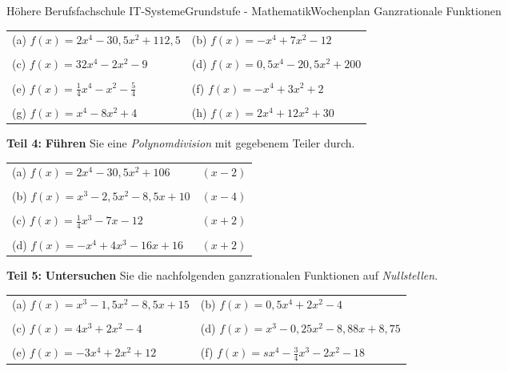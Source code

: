 \documentclass[oneside,openany,headings=optiontotoc,11pt,numbers=noenddot]{scrreprt}
\begin{document}
\begin{worksheet}{Höhere Berufsfachschule IT-Systeme}{Grundstufe - Mathematik}{Wochenplan Ganzrationale Funktionen}
\begin{framed}
			\par\noindent
			\begin{tabularx}{\textwidth}{XX}
				(a) \(f(x) = 2x^4 -30,5x^2 + 112,5\) & (b) \(f(x) = -x^4 + 7x^2 -12\)\\
				\\
				(c) \(f(x) = 32x^4-2x^2-9\) & (d) \(f(x) = 0,5x^4 -20,5x^2 +200\)\\
				\\
				(e) \(f(x) = \frac{1}{4}x^4 - x^2 - \frac{5}{4}\) & (f) \(f(x) = -x^4+3x^2+2\)\\
				\\
				(g) \(f(x) = x^4 -8x^2 +4\) & (h) \(f(x) = 2x^4+12x^2 +30\)
			\end{tabularx}
		\end{framed}
		\newpage
		\begin{framed}
			\noindent
			\textbf{Teil 4:} \textbf{Führen} Sie eine \textit{Polynomdivision} mit gegebenem Teiler durch.\\
			\par\noindent
			\begin{tabularx}{\textwidth}{XX}
				(a) \(f(x) = 2x^4 - 30,5x^2 + 106\) & \((x-2)\)\\
				\\
				(b) \(f(x) = x^3 -2,5x^2 -8,5x +10\) & \((x-4)\)\\
				\\
				(c) \(f(x) = \frac{1}{4}x^3 -7x -12\) & \((x+2)\)\\
				\\
				(d) \(f(x) = -x^4 + 4x^3 -16x+16\) & \((x+2)\)
			\end{tabularx}
		\end{framed}
		\begin{framed}
			\noindent
			\textbf{Teil 5:} \textbf{Untersuchen} Sie die nachfolgenden ganzrationalen Funktionen auf \textit{Nullstellen}.\\
			\par\noindent
			\begin{tabularx}{\textwidth}{XX}
				(a) \(f(x) = x^3- 1,5x^2 - 8,5x + 15\) & (b) \(f(x) = 0,5x^4 + 2x^2-4\)\\
				\\
				(c) \(f(x) = 4x^3 +2x^2 - 4\) & (d) \(f(x) = x^3 -0,25x^2 -8,88x +8,75\)\\
				\\
				(e) \(f(x) = -3x^4+2x^2+12\) & (f) \(f(x) = sx^4 - \frac{3}{4}x^3 -2x^2 -18\)\\
			\end{tabularx}
		\end{framed}
	\end{worksheet}
\end{document}
